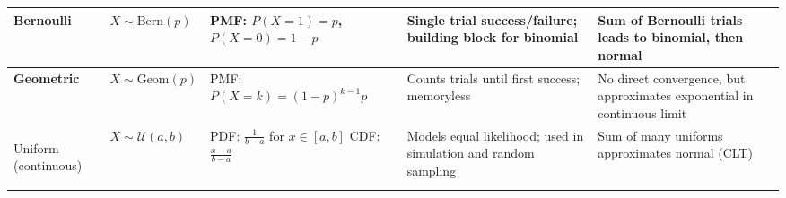 \documentclass[10pt]{article}
\begin{document}
\begin{longtable}{|>{\bfseries}m{2cm}|m{2.8cm}|p{4.5cm}|p{5.2cm}|p{4.5cm}|}
  Bernoulli & $X \sim \mathrm{Bern}(p)$ &
  PMF: $P(X=1) = p$, $P(X=0) = 1 - p$ &
  Single trial success/failure; building block for binomial &
  Sum of Bernoulli trials leads to binomial, then normal \\
  \hline

  Geometric & $X \sim \mathrm{Geom}(p)$ &
  PMF: $P(X = k) = (1 - p)^{k - 1} p$ &
  Counts trials until first success; memoryless &
  No direct convergence, but approximates exponential in continuous limit \\
  \hline

  Uniform (continuous) & $X \sim \mathcal{U}(a, b)$ &
  PDF: $\frac{1}{b - a}$ for $x \in [a, b]$ \newline
  CDF: $\frac{x - a}{b - a}$ &
  Models equal likelihood; used in simulation and random sampling &
  Sum of many uniforms approximates normal (CLT) \\
  \hline

\end{longtable}
\end{document}
